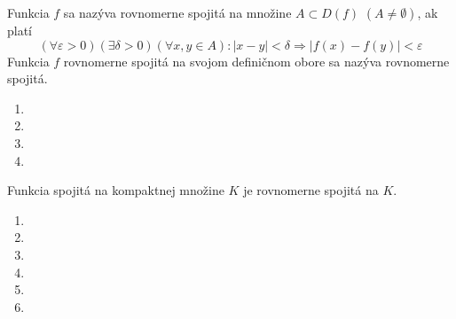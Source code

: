 Funkcia $f$ sa nazýva rovnomerne spojitá na množine $A \subset D(f)$ $(A \neq
\emptyset)$, ak platí
\[
  (\forall \varepsilon > 0)
    (\exists \delta > 0)
      (\forall x,y\in A):
        |x-y| < \delta \Rightarrow |f(x)-f(y)| < \varepsilon
\]
Funkcia $f$ rovnomerne spojitá na svojom definičnom obore sa nazýva rovnomerne
spojitá.

\begin{enumerate}[resume]
  \item {}
  \item {}
  \item {}
  \item {}
\end{enumerate}

\begin{veta}
Funkcia spojitá na kompaktnej množine $K$ je rovnomerne spojitá na $K$.
\end{veta}

\begin{enumerate}[resume]
  \item {}
  \item {}
  \item {}
  \item {}
  \item {}
  \item {}
\end{enumerate}
